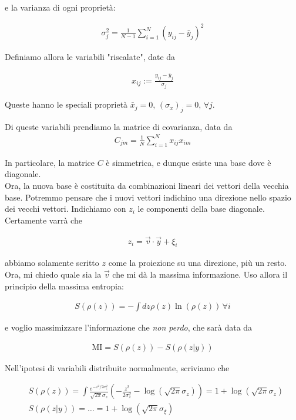 \documentclass{report}
\begin{document}
e la varianza di ogni proprietà: 

\begin{align}
    \sigma^2_j = \frac{1}{N-1}\sum_{i=1}^N (y_{ij}- \bar{y}_j)^2
\end{align}

Definiamo allora le variabili "riscalate", date da 

\begin{align}
    x_{ij} := \frac{y_{ij}-\bar{y}_j}{\sigma_j}
\end{align}

Queste hanno le speciali proprietà \(\bar{x}_j = 0, \, (\sigma_x)_j =0, \, \forall j\). 

Di queste variabili prendiamo la matrice di covarianza, data da 
\begin{align}
    C_{jm} = \frac{1}{N}\sum_{i=1}^N x_{ij}x_{im}
\end{align}

In particolare, la matrice \(C\) è simmetrica, e dunque esiste una base dove è diagonale. \\

Ora, la nuova base è costituita da combinazioni lineari dei vettori della vecchia base. Potremmo pensare che i nuovi vettori indichino una direzione nello spazio dei vecchi vettori. Indichiamo con \(z_i\) le componenti della base diagonale. Certamente varrà che 

\begin{align}
    z_i = \vec{v}\cdot \vec{y} + \xi_i
\end{align}

abbiamo solamente scritto \(z\) come la proiezione su una direzione, più un resto. Ora, mi chiedo quale sia la \(\vec{v}\) che mi dà la massima informazione. Uso allora il principio della massima entropia: 

\begin{align}
    S (\rho(z)) = -\int dz \rho(z)\ln(\rho(z)) \, \forall i 
\end{align}

e voglio massimizzare l'informazione che \emph{non perdo}, che sarà data da 

\begin{align}
    \text{MI} = S(\rho(z)) - S(\rho(z|y))
\end{align}

Nell'ipotesi di variabili distribuite normalmente, scriviamo che 

\begin{align}
    &S(\rho(z)) = \int \frac{e^{-z^2/2\sigma^2_z}}{\sqrt{2\pi}\sigma_z}\left(-\frac{z^2}{2\sigma^2_z} - \log(\sqrt{2\pi}\sigma_z)\right) = 1 + \log(\sqrt{2\pi}\sigma_z) \\
    &S(\rho(z|y)) = \ldots = 1 + \log(\sqrt{2\pi}\sigma_{\xi})
\end{align}
\end{document}
